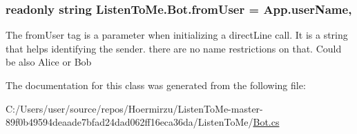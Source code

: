 \subsubsection[{\texorpdfstring{from\+User}{fromUser}}]{\setlength{\rightskip}{0pt plus 5cm}readonly string Listen\+To\+Me.\+Bot.\+from\+User = {\bf App.\+user\+Name}\hspace{0.3cm}{\ttfamily [static]}, {\ttfamily [private]}}\hypertarget{class_listen_to_me_1_1_bot_adeb0c25a77e095d890c32da6f06ed669}{}\label{class_listen_to_me_1_1_bot_adeb0c25a77e095d890c32da6f06ed669}


The from\+User tag is a parameter when initializing a direct\+Line call. It is a string that helps identifying the sender. there are no name restrictions on that. Could be also \textquotesingle{}Alice\textquotesingle{} or \textquotesingle{}Bob\textquotesingle{} 



The documentation for this class was generated from the following file\+:\begin{DoxyCompactItemize}
\item 
C\+:/\+Users/user/source/repos/\+Hoermirzu/\+Listen\+To\+Me-\/master-\/89f0b49594deaade7bfad24dad062ff16eca36da/\+Listen\+To\+Me/\hyperlink{_bot_8cs}{Bot.\+cs}\end{DoxyCompactItemize}
